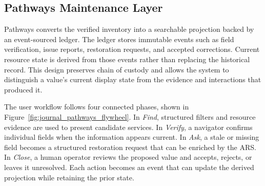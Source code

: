 \documentclass[journal,article,submit,moreauthors]{Definitions/mdpi}
\begin{document}
\subsection{Pathways Maintenance Layer}

Pathways converts the verified inventory into a searchable projection backed by an event-sourced ledger. The ledger stores immutable events such as field verification, issue reports, restoration requests, and accepted corrections. Current resource state is derived from those events rather than replacing the historical record. This design preserves chain of custody and allows the system to distinguish a value’s current display state from the evidence and interactions that produced it.

The user workflow follows four connected phases, shown in Figure~\ref{fig:journal_pathways_flywheel}. In \textit{Find}, structured filters and resource evidence are used to present candidate services. In \textit{Verify}, a navigator confirms individual fields when the information appears current. In \textit{Ask}, a stale or missing field becomes a structured restoration request that can be enriched by the ARS. In \textit{Close}, a human operator reviews the proposed value and accepts, rejects, or leaves it unresolved. Each action becomes an event that can update the derived projection while retaining the prior state.
\end{document}
